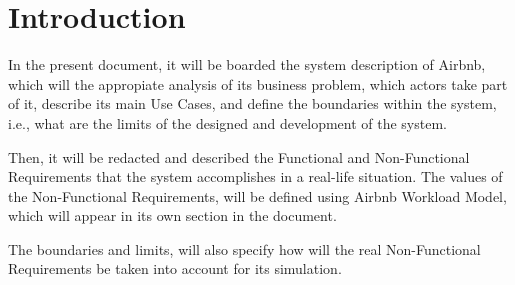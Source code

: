 \section{Introduction}

In the present document, it will be boarded the system description of Airbnb, 
which will the appropiate analysis of its business problem, which actors take part of it,
describe its main Use Cases, and define the boundaries within the system, i.e., what are the limits 
of the designed and development of the system.

Then, it will be redacted and described the Functional and Non-Functional Requirements that the system 
accomplishes in a real-life situation. The values of the Non-Functional Requirements, will be defined using 
Airbnb Workload Model, which will appear in its own section in the document.

The boundaries and limits, will also specify how will the real Non-Functional Requirements be taken into 
account for its simulation.